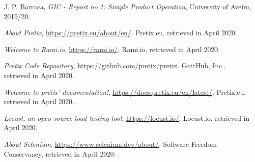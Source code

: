 \documentclass[12pt]{article}
\begin{document}
\begin{thebibliography}{9} %
  

    J. P. Barraca,
    \textit{GIC - Report no.1: Simple Product Operation},
    University of Aveiro,
    2019/20.

    \textit{About Pretix},
    \url{https://pretix.eu/about/en/}.
    Pretix.eu,
    retrieved in April 2020.

    \textit{Welcome to Rami.io},
    \url{https://rami.io/}.
    Rami.io,
    retrieved in April 2020.

    \textit{Pretix Code Repository},
    \url{https://github.com/pretix/pretix}.
    GuitHub, Inc.,
    retrieved in April 2020.

    \textit{Welcome to pretix' documentation!},
    \url{https://docs.pretix.eu/en/latest/}.
    Pretix.eu,
    retrieved in April 2020.



    \textit{Locust, an open source load testing tool},
    \url{https://locust.io/}.
    Locust.io,
    retrieved in April 2020.

    \textit{About Selenium},
    \url{https://www.selenium.dev/about/}.
    Software Freedom Conservancy,
    retrieved in April 2020.

\end{thebibliography}

\clearpage
\end{document}
